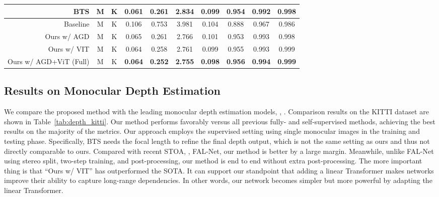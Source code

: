 \documentclass[10pt,twocolumn,letterpaper]{article}
\begin{document}
\begin{table*}[t]
{\begin{tabular}{rccccccccc}
BTS \cite{lee2019big}& M & K & 0.061 & 0.261 & 2.834 & 0.099 & 0.954 & 0.992 & 0.998 \\
 \midrule
Baseline & M & K & 0.106 & 0.753 &  3.981 & 0.104 & 0.888  & 0.967  & 0.986\\
Ours w/ AGD & M & K & 0.065 & 0.261 & 2.766 & 0.101 & 0.953 & 0.993 & 0.998 \\
Ours w/ VIT & M & K & 0.064 & 0.258 & 2.761 & 0.099 & 0.955 & 0.993 & 0.999\\
Ours w/ AGD+ViT (Full) & M & K & \textbf{0.064} & \textbf{0.252} & \textbf{2.755} & \textbf{0.098} & \textbf{0.956} & \textbf{0.994} & \textbf{0.999} \\
\bottomrule[1.2pt]
\end{tabular}}
\vspace{-0.4cm}
\end{table*}


\subsection{Results on Monocular Depth Estimation}
We compare the proposed method with the leading monocular depth estimation models, \ie, \cite{ranjan2019competitive,bian2019unsupervised,spencer2020defeat,cheng2020s,godard2019digging,tiwari2020pseudo,johnston2020self,klingner2020self,shu2020feature,guizilini20203d,fu2018deep,yin2019enforcing,gonzalez2020forget,lee2019big}. 
Comparison results on the KITTI dataset are shown in Table~\ref{tab:depth_kitti}. 
Our method performs favorably versus all previous fully- and self-supervised methods, achieving the best results on the majority of the metrics. 
Our approach employs the supervised setting using single monocular images in the training and testing phase.
Specifically, BTS needs the focal length to refine the final depth output, which is not the same setting as ours and thus not directly comparable to ours. 
Compared with recent STOA, \ie, FAL-Net, our method is better by a large margin. Meanwhile, unlike FAL-Net using stereo split, two-step training, and post-processing, our method is end to end without extra post-processing. The more important thing is that ``Ours w/ VIT'' has outperformed the SOTA.
It can support our standpoint that adding a linear Transformer makes networks improve their ability to capture long-range dependencies. In other words, our network becomes simpler but more powerful by adapting the linear Transformer.
\end{document}
